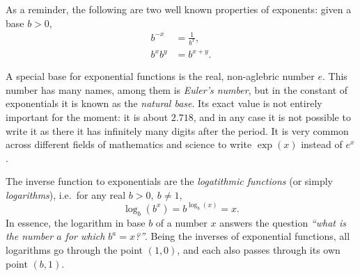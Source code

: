 As a reminder, the following are two well known properties of exponents: given a base $b>0$,
\begin{align}
	b^{-x} &= \frac{1}{b^{x}},\\
	b^{x}b^{y} &= b^{x+y}.
	\label{eq:exponents_properties}
\end{align}

A special base for exponential functions is the real, non-aglebric number $e$. This number has many names, among them is \emph{Euler's number}, but in the constant of exponentials it is known as the \emph{natural base}. Its exact value is not entirely important for the moment: it is about $2.718$, and in any case it is not possible to write it as there it has infinitely many digits after the period. It is very common across different fields of mathematics and science to write $\exp(x)$ instead of $e^{x}$.

The inverse function to exponentials are the \emph{logatithmic functions} (or simply \emph{logarithms}), i.e.\ for any real $b>0,\ b\neq1$,
\begin{equation}
	\log_{b}\left( b^{x} \right) = b^{\log_{b}(x)} = x.
	\label{eq:logarithms}
\end{equation}
In essence, the logarithm in base $b$ of a number $x$ answers the question \textit{``what is the number $a$ for which $b^{a}=x$?''}. Being the inverses of exponential functions, all logarithms go through the point $(1,0)$, and each also passes through its own point $(b,1)$.

